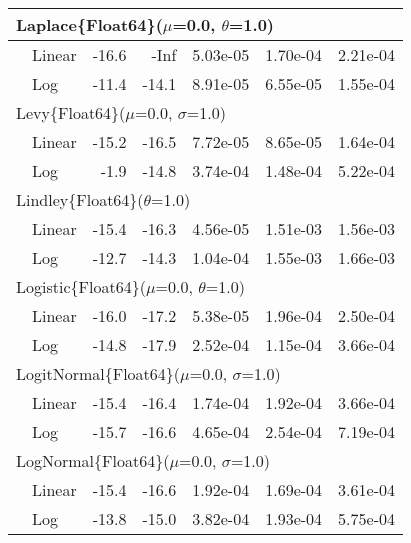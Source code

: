 \begin{tabular}{|llrrrrr|}
\hline
\multicolumn{7}{|l|}{Laplace\{Float64\}($\mu$=0.0, $\theta$=1.0)}\\ \hline
& Linear & {\color{blue}-16.6} & {\color{blue}-Inf} & {\color{blue}5.03e-05} & 1.70e-04 & 2.21e-04\\
& Log & -11.4 & -14.1 & 8.91e-05 & {\color{blue}6.55e-05} & {\color{blue}1.55e-04}\\
\hline
\multicolumn{7}{|l|}{Levy\{Float64\}($\mu$=0.0, $\sigma$=1.0)}\\ \hline
& Linear & {\color{blue}-15.2} & {\color{blue}-16.5} & {\color{blue}7.72e-05} & {\color{blue}8.65e-05} & {\color{blue}1.64e-04}\\
& Log & -1.9 & -14.8 & 3.74e-04 & 1.48e-04 & 5.22e-04\\
\hline
\multicolumn{7}{|l|}{Lindley\{Float64\}($\theta$=1.0)}\\ \hline
& Linear & {\color{blue}-15.4} & {\color{blue}-16.3} & {\color{blue}4.56e-05} & {\color{blue}1.51e-03} & {\color{blue}1.56e-03}\\
& Log & -12.7 & -14.3 & 1.04e-04 & 1.55e-03 & 1.66e-03\\
\hline
\multicolumn{7}{|l|}{Logistic\{Float64\}($\mu$=0.0, $\theta$=1.0)}\\ \hline
& Linear & {\color{blue}-16.0} & -17.2 & {\color{blue}5.38e-05} & 1.96e-04 & {\color{blue}2.50e-04}\\
& Log & -14.8 & {\color{blue}-17.9} & 2.52e-04 & {\color{blue}1.15e-04} & 3.66e-04\\
\hline
\multicolumn{7}{|l|}{LogitNormal\{Float64\}($\mu$=0.0, $\sigma$=1.0)}\\ \hline
& Linear & -15.4 & -16.4 & {\color{blue}1.74e-04} & {\color{blue}1.92e-04} & {\color{blue}3.66e-04}\\
& Log & {\color{blue}-15.7} & {\color{blue}-16.6} & 4.65e-04 & 2.54e-04 & 7.19e-04\\
\hline
\multicolumn{7}{|l|}{LogNormal\{Float64\}($\mu$=0.0, $\sigma$=1.0)}\\ \hline
& Linear & {\color{blue}-15.4} & {\color{blue}-16.6} & {\color{blue}1.92e-04} & {\color{blue}1.69e-04} & {\color{blue}3.61e-04}\\
& Log & -13.8 & -15.0 & 3.82e-04 & 1.93e-04 & 5.75e-04\\
\hline
\end{tabular}